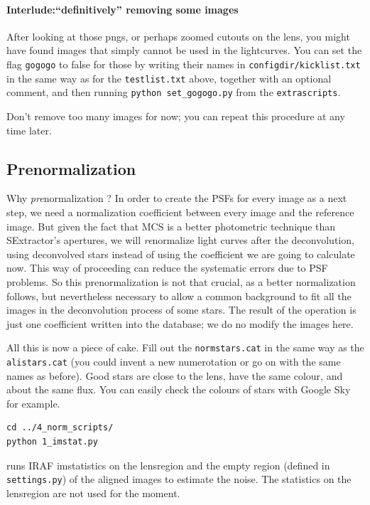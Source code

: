\paragraph{Interlude:``definitively'' removing some images}
After looking at those pngs, or perhaps zoomed cutouts on the lens, you might have found images that simply cannot be used in the lightcurves. You can set the flag \verb+gogogo+ to false for those by writing their names in \verb+configdir/kicklist.txt+ in the same way as for the \verb+testlist.txt+ above, together with an optional comment, and then running \verb+python set_gogogo.py+ from the \verb+extrascripts+.

Don't remove too many images for now; you can repeat this procedure at any time later.

\subsection{Prenormalization}
Why \emph{pre}normalization ? In order to create the PSFs for every image as a next step, we need a normalization coefficient between every image and the reference image. But given the fact that MCS is a better photometric technique than SExtractor's apertures, we will \emph{re}normalize light curves after the deconvolution, using deconvolved stars instead of using the coefficient we are going to calculate now. This way of proceeding can reduce the systematic errors due to PSF problems. So this prenormalization is not that crucial, as a better normalization follows, but nevertheless necessary to allow a common background to fit all the images in the deconvolution process of some stars. The result of the operation is just one coefficient written into the database; we do no modify the images here.

All this is now a piece of cake. Fill out the \verb+normstars.cat+ in the same way as the \verb+alistars.cat+ (you could invent a new numerotation or go on with the same names as before). Good stars are close to the lens, have the same colour, and about the same flux. You can easily check the colours of stars with Google Sky for example.


\begin{Verbatim}
cd ../4_norm_scripts/
python 1_imstat.py
\end{Verbatim}
runs IRAF imstatistics on the lensregion and the empty region (defined in \verb+settings.py+) of the aligned images to estimate the noise. The statistics on the lensregion are not used for the moment.

